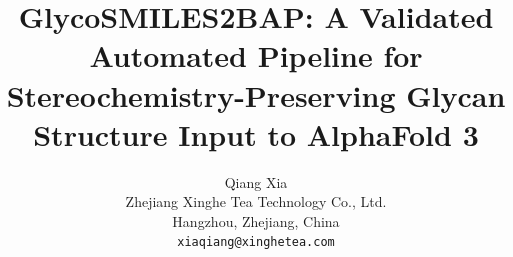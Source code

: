 







\title{
\textbf{GlycoSMILES2BAP: A Validated Automated Pipeline for 
Stereochemistry-Preserving Glycan Structure Input to AlphaFold 3}
}



\author{
Qiang Xia\\
\small Zhejiang Xinghe Tea Technology Co., Ltd.\\
\small Hangzhou, Zhejiang, China\\
\small \texttt{xiaqiang@xinghetea.com}
}

\date{}



